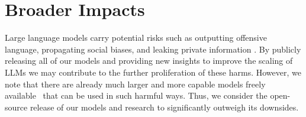 \documentclass{article}
\begin{document}
\section{Broader Impacts}
\label{sec:broad}

Large language models carry potential risks such as outputting offensive language, propagating social biases, and leaking private information \cite{weidinger2021ethical,bender2021dangers}. By publicly releasing all of our models and providing new insights to improve the scaling of LLMs we may contribute to the further proliferation of these harms. However, we note that there are already much larger and more capable models freely available~\cite{black2021gpt,black2022gpt,scao2022bloom,biderman2023pythia} that can be used in such harmful ways. Thus, we consider the open-source release of our models and research to significantly outweigh its downsides.








\end{document}
